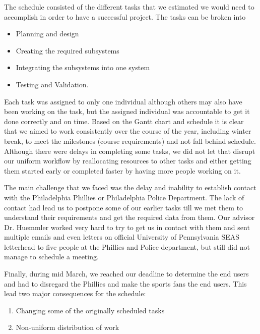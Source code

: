 The schedule consisted of the different tasks that we estimated we
would need to accomplish in order to have a successful project. The
tasks can be broken into

\begin{itemize}
  \item Planning and design
  \item Creating the required subsystems
  \item Integrating the subsystems into one system
  \item Testing and Validation.
\end{itemize}

Each task was assigned to only one individual although others may also
have been working on the task, but the assigned individual was
accountable to get it done correctly and on time. Based on the Gantt
chart and schedule it is clear that we aimed to work consistently over
the course of the year, including winter break, to meet the milestones
(course requirements) and not fall behind schedule. Although there
were delays in completing some tasks, we did not let that disrupt our
uniform workflow by reallocating resources to other tasks and either
getting them started early or completed faster by having more people
working on it.

The main challenge that we faced was the delay and inability to
establish contact with the Philadelphia Phillies or Philadelphia
Police Department. The lack of contact had lead us to postpone some of
our earlier tasks till we met them to understand their requirements
and get the required data from them. Our advisor Dr. Huemmler worked
very hard to try to get us in contact with them and sent multiple
emails and even letters on official University of Pennsylvania SEAS
letterhead to five people at the Phillies and Police department, but
still did not manage to schedule a meeting.

Finally, during mid March, we reached our deadline to determine the
end users and had to disregard the Phillies and make the sports fans
the end users. This lead two major consequences for the schedule:

\begin{enumerate}
  \item Changing some of the originally scheduled tasks
  \item Non-uniform distribution of work
\end{enumerate}


